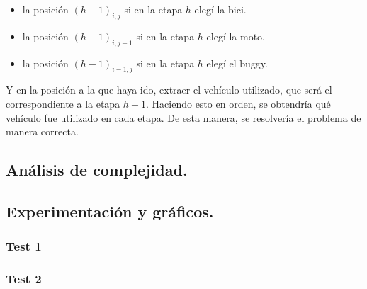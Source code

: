 \begin{itemize}
	\item la posición $(h-1)_{i,j}$ si en la etapa $h$ elegí la bici.
	\item la posición $(h-1)_{i,j-1}$ si en la etapa $h$ elegí la moto.
	\item la posición $(h-1)_{i-1,j}$ si en la etapa $h$ elegí el buggy.
\end{itemize}			

	 Y en la posición a la que haya ido, extraer el vehículo utilizado, que será el correspondiente a la etapa $h-1$. Haciendo esto en orden, se obtendría qué vehículo fue utilizado en cada etapa. De esta manera, se resolvería el problema de manera correcta.
 
\vspace*{0.6cm}


\subsection{Análisis de complejidad.}

\vspace*{0.3cm}


\vspace*{0.6cm}
\subsection{Experimentación y gráficos.}

\vspace*{0.3cm}

\subsubsection{Test 1}

\vspace*{0.3cm}

\vspace*{0.6cm}
\subsubsection{Test 2}

\vspace*{0.3cm}

